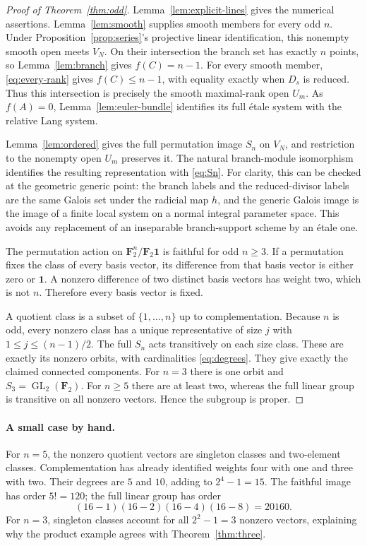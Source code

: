 \documentclass[11pt]{article}
\theoremstyle{remark}\newtheorem{remark}[theorem]{Remark}
\newcommand{\FF}{\mathbf F}
\newcommand{\GL}{\operatorname{GL}}
\begin{document}
\begin{proof}[Proof of Theorem~\ref{thm:odd}]
Lemma~\ref{lem:explicit-lines} gives the numerical assertions. Lemma~\ref{lem:smooth} supplies smooth members for every odd $n$. Under Proposition~\ref{prop:series}'s projective linear identification, this nonempty smooth open meets $V_N$. On their intersection the branch set has exactly $n$ points, so Lemma~\ref{lem:branch} gives $f(C)=n-1$. For every smooth member, \eqref{eq:every-rank} gives $f(C)\le n-1$, with equality exactly when $D_s$ is reduced. Thus this intersection is precisely the smooth maximal-rank open $U_m$. As $f(A)=0$, Lemma~\ref{lem:euler-bundle} identifies its full \'etale system with the relative Lang system.

Lemma~\ref{lem:ordered} gives the full permutation image $S_n$ on $V_N$, and restriction to the nonempty open $U_m$ preserves it. The natural branch-module isomorphism identifies the resulting representation with \eqref{eq:Sn}. For clarity, this can be checked at the geometric generic point: the branch labels and the reduced-divisor labels are the same Galois set under the radicial map $h$, and the generic Galois image is the image of a finite local system on a normal integral parameter space. This avoids any replacement of an inseparable branch-support scheme by an \'etale one.

The permutation action on $\FF_2^n/\FF_2\mathbf1$ is faithful for odd $n\ge3$. If a permutation fixes the class of every basis vector, its difference from that basis vector is either zero or $\mathbf1$. A nonzero difference of two distinct basis vectors has weight two, which is not $n$. Therefore every basis vector is fixed.

A quotient class is a subset of $\{1,\ldots,n\}$ up to complementation. Because $n$ is odd, every nonzero class has a unique representative of size $j$ with $1\le j\le(n-1)/2$. The full $S_n$ acts transitively on each size class. These are exactly its nonzero orbits, with cardinalities \eqref{eq:degrees}. They give exactly the claimed connected components. For $n=3$ there is one orbit and $S_3=\GL_2(\FF_2)$. For $n\ge5$ there are at least two, whereas the full linear group is transitive on all nonzero vectors. Hence the subgroup is proper.
\end{proof}

\paragraph{A small case by hand.}
For $n=5$, the nonzero quotient vectors are singleton classes and two-element classes. Complementation has already identified weights four with one and three with two. Their degrees are $5$ and $10$, adding to $2^4-1=15$. The faithful image has order $5!=120$; the full linear group has order
\[
                      (16-1)(16-2)(16-4)(16-8)=20160.
\]
For $n=3$, singleton classes account for all $2^2-1=3$ nonzero vectors, explaining why the product example agrees with Theorem~\ref{thm:three}.
\end{document}
